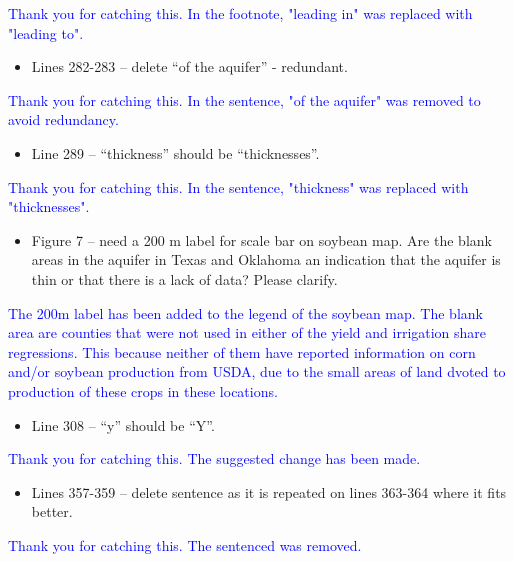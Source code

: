 \documentclass[
]{article}
\providecommand{\tightlist}{%
  \setlength{\itemsep}{0pt}\setlength{\parskip}{0pt}}
\begin{document}
\textcolor{blue}{Thank you for catching this. In the footnote, "leading in" was replaced with "leading to".}

\begin{itemize}
\tightlist
\item
  Lines 282-283 -- delete ``of the aquifer'' - redundant.
\end{itemize}

\textcolor{blue}{Thank you for catching this. In the sentence, "of the aquifer" was removed to avoid redundancy.}

\begin{itemize}
\tightlist
\item
  Line 289 -- ``thickness'' should be ``thicknesses''.
\end{itemize}

\textcolor{blue}{Thank you for catching this. In the sentence, "thickness" was replaced with "thicknesses".}

\begin{itemize}
\tightlist
\item
  Figure 7 -- need a 200 m label for scale bar on soybean map. Are the
  blank areas in the aquifer in Texas and Oklahoma an indication that
  the aquifer is thin or that there is a lack of data? Please clarify.
\end{itemize}

\textcolor{blue}{The 200m label has been added to the legend of the soybean map. The blank area are counties that were not used in either of the yield and irrigation share regressions. This because neither of them have reported information on corn and/or soybean production from USDA, due to the small areas of land dvoted to production of these crops in these locations. 
}

\begin{itemize}
\tightlist
\item
  Line 308 -- ``y'' should be ``Y''.
\end{itemize}

\textcolor{blue}{Thank you for catching this. The suggested change has been made.}

\begin{itemize}
\tightlist
\item
  Lines 357-359 -- delete sentence as it is repeated on lines 363-364
  where it fits better.
\end{itemize}

\textcolor{blue}{Thank you for catching this. The sentenced was removed.}
\end{document}
